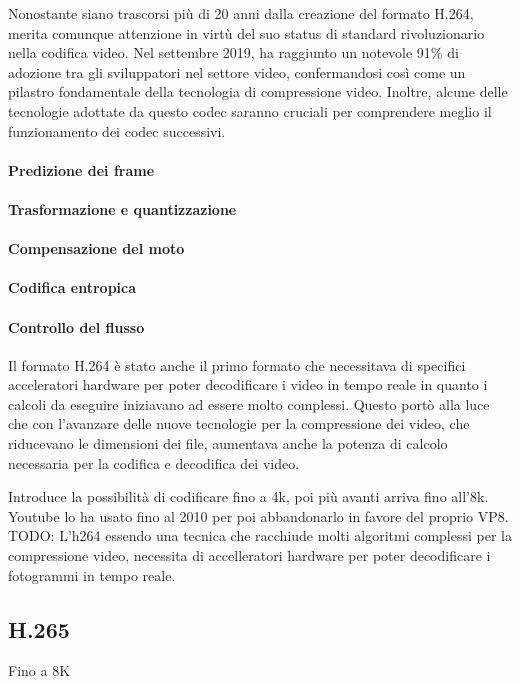 \documentclass[a4paper,12pt, oneside]{article}
\begin{document}
Nonostante siano trascorsi più di 20 anni dalla creazione del formato H.264, merita comunque attenzione
in virtù del suo status di standard rivoluzionario nella codifica video. Nel settembre 2019, ha
raggiunto un notevole 91\% di adozione tra gli sviluppatori nel settore video, confermandosi così come
un pilastro fondamentale della tecnologia di compressione video. Inoltre, alcune delle tecnologie
adottate da questo codec saranno cruciali per comprendere meglio il funzionamento dei codec successivi.

\paragraph{Predizione dei frame}
\paragraph{Trasformazione e quantizzazione}
\paragraph{Compensazione del moto}
\paragraph{Codifica entropica}
\paragraph{Controllo del flusso}

Il formato H.264 è stato anche il primo formato che necessitava di specifici acceleratori hardware per
poter decodificare i video in tempo reale in quanto i calcoli da eseguire iniziavano ad essere molto
complessi. Questo portò alla luce che con l'avanzare delle nuove tecnologie per la compressione dei
video, che riducevano le dimensioni dei file, aumentava anche la potenza di calcolo necessaria per
la codifica e decodifica dei video.

Introduce la possibilità di codificare fino a 4k, poi più avanti arriva fino all'8k.
Youtube lo ha usato fino al 2010 per poi abbandonarlo in favore del proprio VP8.
TODO: L'h264 essendo una tecnica che racchiude molti algoritmi complessi per la compressione video, necessita di accelleratori hardware per poter decodificare i fotogrammi in tempo reale.

\subsection{H.265}
Fino a 8K
\end{document}
